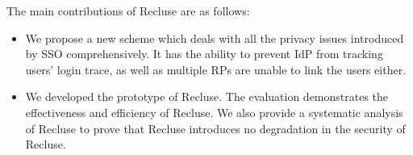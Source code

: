 

The main contributions of Recluse are as follows:
\begin{itemize}
\item We propose a new scheme which deals with all the privacy issues introduced by SSO comprehensively. It has the ability to prevent IdP from tracking users' login trace, as well as multiple RPs are unable to link the users either.
\item We developed the prototype of Recluse. The evaluation demonstrates the effectiveness and efficiency of Recluse. We also provide a systematic analysis of Recluse to prove that Recluse introduces no degradation in the security of Recluse.
\end{itemize}




